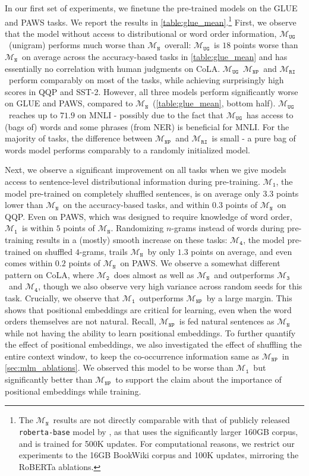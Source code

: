 \documentclass[letterpaper, 12pt]{report}
\newcommand{\OR}{$\mathcal{M}_{\texttt{N}}$}
\newcommand{\RI}{$\mathcal{M}_{\texttt{1}}$}
\newcommand{\RII}{$\mathcal{M}_{\texttt{2}}$}
\newcommand{\RIII}{$\mathcal{M}_{\texttt{3}}$}
\newcommand{\RIV}{$\mathcal{M}_{\texttt{4}}$}
\newcommand{\RC}{$\mathcal{M}_{\texttt{UG}}$}
\newcommand{\RT}{$\mathcal{M}_{\texttt{RI}}$}
\newcommand{\NP}{$\mathcal{M}_{\texttt{NP}}$}
\begin{document}
In our first set of experiments, we finetune the pre-trained models
on the GLUE and PAWS tasks.
We report the results in \autoref{table:glue_mean}.\footnote{The \OR\ results are not directly comparable with that of publicly released \texttt{roberta-base} model by \citet{liu2019b}, as that uses the significantly larger 160GB corpus, and is trained for 500K updates. For computational reasons, we restrict our experiments to the 16GB BookWiki corpus and 100K updates, mirroring the RoBERTa ablations.}
First, we observe that the model without access to distributional or word order information, \RC\ (unigram) performs much worse than \OR\ overall:
\RC\ is $18$ points worse than \OR\ on average across the accuracy-based tasks in \autoref{table:glue_mean} and has essentially no correlation with human judgments on CoLA. \RC\, \NP\ and \RT\ perform comparably on most of the tasks, while achieving surprisingly high scores in QQP and SST-2. However, all three models perform significantly worse on GLUE and PAWS, compared to \OR\ (\autoref{table:glue_mean}, bottom half).
\RC\ reaches up to $71.9$ on MNLI - possibly due to the fact that \RC\ has access to (bags of) words and some phrases (from NER) is beneficial for MNLI. For the majority of tasks, the difference between \NP\ and \RT\ is small - a pure bag of words model performs comparably to a randomly initialized model.

Next, we observe a significant improvement on all tasks when we give models access to sentence-level distributional information during pre-training.
\RI, the model pre-trained on completely shuffled sentences, is on average only $3.3$ points lower than \OR\ on the accuracy-based tasks,
and within $0.3$ points of \OR\ on QQP.
Even on PAWS, which was designed to require knowledge of word order, \RI\ is within $5$ points of \OR.
Randomizing $n$-grams instead of words during pre-training results in a (mostly) smooth increase on these tasks: \RIV, the model pre-trained on shuffled $4$-grams, trails \OR\ by only $1.3$ points on average, and even comes within $0.2$ points of \OR\ on PAWS.
We observe a somewhat different pattern on CoLA, where \RII\ does almost as well as \OR\ and outperforms \RIII\ and \RIV, though we also observe very high variance across random seeds for this task.
Crucially, we observe that \RI\ outperforms \NP\ by a large margin. This shows that positional embeddings are critical for learning, even when the word orders themselves are not natural. Recall, \NP\ is fed natural sentences as \OR\, while not having the ability to learn positional embeddings. To further quantify the effect of positional embeddings, we also investigated the effect of shuffling the entire context window, to keep the co-occurrence information same as \NP\ in \autoref{sec:mlm_ablations}. We observed this model to be worse than \RI\, but significantly better than \NP\, to support the claim about the importance of positional embeddings while training.
\end{document}
